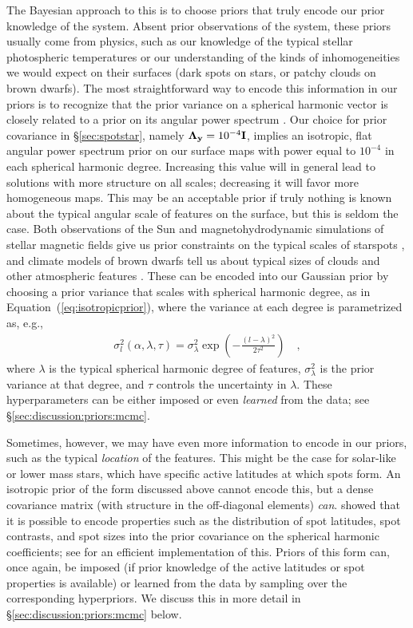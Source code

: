 \documentclass[modern]{aastex631}
\begin{document}
The Bayesian approach to this is to choose priors that truly encode our prior knowledge of the system. 
Absent prior observations of the system, these priors usually come from physics, such as our knowledge of the typical stellar photospheric temperatures or our understanding of the kinds of inhomogeneities we would expect on their surfaces (dark spots on stars, or patchy clouds on brown dwarfs). 
The most straightforward way to encode this information in our priors is to recognize that the prior variance on a spherical harmonic vector is closely related to a prior on its angular power spectrum \citep[see, e.g.,][]{Baldi2006,Wandelt2012}.
Our choice for prior covariance in \S\ref{sec:spotstar}, namely $\boldsymbol{\Lambda}_{\mathbf{y}} = 10^{-4}{\mathbf{I}}$, implies an isotropic, flat angular power spectrum prior on our surface maps with power equal to $10^{-4}$ in each spherical harmonic degree.
Increasing this value will in general lead to solutions with more structure on all scales; decreasing it will favor more homogeneous maps.
This may be an acceptable prior if truly nothing is known about the typical angular scale of features on the surface, but this is seldom the case.
Both observations of the Sun and magnetohydrodynamic simulations of stellar magnetic fields give us prior constraints on the typical scales of starspots \citep[e.g.,][]{Berdyugina2005,Solanki2006}, and climate models of brown dwarfs tell us about typical sizes of clouds and other atmospheric features \citep[e.g.,][]{Tan2019,Tan2020,Tan2021a,Tan2021b}.
These can be encoded into our Gaussian prior by choosing a prior variance that scales with spherical harmonic degree, as in Equation~(\ref{eq:isotropicprior}), where the variance at each degree is parametrized as, e.g.,
%
\begin{align}
    \label{eq:powerspec}
    \sigma_l^2(\alpha, \lambda, \tau) = \sigma_\lambda^2 \exp\left(-\frac{(l - \lambda)^2}{2\tau^2}\right)
    \quad,
\end{align}
%
where $\lambda$ is the typical spherical harmonic degree of features, $\sigma_\lambda^2$ is the prior variance at that degree, and $\tau$ controls the uncertainty in $\lambda$.
These hyperparameters can be either imposed or even \emph{learned} from the data; see \S\ref{sec:discussion:priors:mcmc}.

Sometimes, however, we may have even more information to encode in our priors, such as the typical \emph{location} of the features. 
This might be the case for solar-like or lower mass stars, which have specific active latitudes at which spots form. 
An isotropic prior of the form discussed above cannot encode this, but a dense covariance matrix (with structure in the off-diagonal elements) \emph{can}. 
\citet{Luger2021b} showed that it is possible to encode properties such as the distribution of spot latitudes, spot contrasts, and spot sizes into the prior covariance on the spherical harmonic coefficients; see \citet{Luger2021d} for an efficient implementation of this. 
Priors of this form can, once again, be imposed (if prior knowledge of the active latitudes or spot properties is available) or learned from the data by sampling over the corresponding hyperpriors. 
We discuss this in more detail in \S\ref{sec:discussion:priors:mcmc} below.
\end{document}
